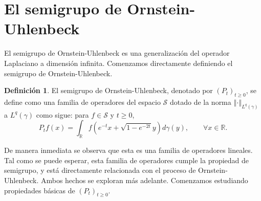 \documentclass[letterpaper,twoside,12pt]{book}
\newcommand{\R}{\mathbb{R}}
\renewcommand{\S}{\mathcal{S}}
\newcommand{\1}{\mathds{1}}
\newcommand{\norm}[1]{\left\Vert #1 \right\Vert}
\theoremstyle{definition}
\newtheorem{dfn}{Definición}
\theoremstyle{definition}
\theoremstyle{definition}
\theoremstyle{definition}
\theoremstyle{definition}
\theoremstyle{definition}
\theoremstyle{definition}
\begin{document}
\section{El semigrupo de Ornstein-Uhlenbeck}
El semigrupo de Ornstein-Uhlenbeck es una generalización del operador Laplaciano a dimensión infinita. Comenzamos directamente definiendo el semigrupo de Ornstein-Uhlenbeck. 
\begin{dfn}
    El semigrupo de Ornstein-Uhlenbeck, denotado por $(P_t)_{t\geq0}$, se define como una familia de operadores del espacio $\S$ dotado de la norma $\norm{\cdot}_{L^q(\gamma)}$ a $L^q(\gamma)$ como sigue: para $f\in \mathcal{S}$ y $t\geq0$,
    \[
    P_tf(x)=\int_\R f\left(e^{-t}x+\sqrt{1-e^{-2t}}y\right)d\gamma(y), \qquad  \forall x\in \R.
    \]
\end{dfn}
De manera inmediata se observa que esta es una familia de operadores lineales. Tal como se puede esperar, esta familia de operadores cumple la propiedad de semigrupo, y está directamente relacionada con el proceso de Ornstein-Uhlenbeck. Ambos hechos se exploran más adelante. Comenzamos estudiando propiedades básicas de $(P_t)_{t\geq0}$.
\end{document}
